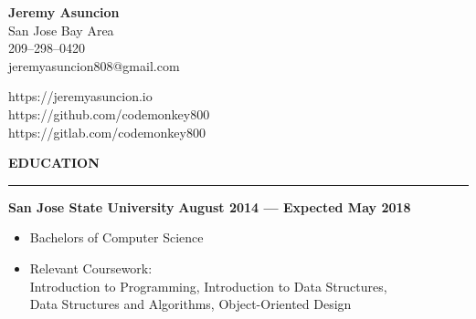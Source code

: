 \documentclass[10pt, oneside]{letter}
\newcommand{\linespaceshit} {
  \vspace{0.05in}
  \hrule
  \vspace{0.05in}
}
\begin{document}
  \begin{minipage}[t]{11cm}
    \flushleft
    \textbf{Jeremy Asuncion} \\
    San Jose Bay Area \\
    209--298--0420 \\
    jeremyasuncion808@gmail.com \\
  \end{minipage}
  \begin{minipage}[t]{7cm}
    \flushright
    https://jeremyasuncion.io \\
    https://github.com/codemonkey800 \\
    https://gitlab.com/codemonkey800 \\
  \end{minipage}

  \vspace{0.1in}

  \textbf{EDUCATION}
  \linespaceshit
    \begin{adjustwidth}{0.1in}{0pt}
      \textbf{San Jose State University} \hfill \textbf{August 2014 --- Expected May 2018}
      \begin{itemize}
        \item Bachelors of Computer Science
        \item Relevant Coursework: \\
          \hspace*{0.5in} Introduction to Programming, Introduction to Data Structures, \\
          \hspace*{0.5in} Data Structures and Algorithms, Object-Oriented Design
      \end{itemize}
    \end{adjustwidth}
\end{document}
